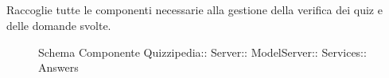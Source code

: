 \subsection{}
Raccoglie tutte le componenti necessarie alla gestione della verifica dei quiz e delle domande svolte.
\begin{figure}[H]
\centering
\noindent{}
\caption[Schema Componente Answers]{Schema Componente Quizzipedia:: Server:: ModelServer:: Services:: Answers}
\end{figure}
